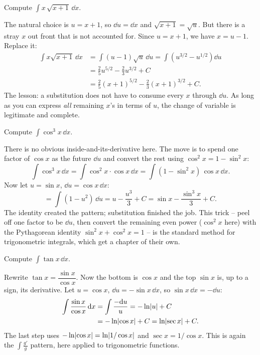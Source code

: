 \begin{example}
\label{ch22:ex-stray}
Compute $\displaystyle \int x\,\sqrt{x+1}\,\dd x$.

The natural choice is $u = x+1$, so $\dd u = \dd x$ and $\sqrt{x+1} = \sqrt u$. But
there is a stray $x$ out front that is not accounted for. Since $u = x+1$, we have
$x = u-1$. Replace it:
\begin{align*}
  \int x\sqrt{x+1}\,\dd x &= \int (u-1)\sqrt u\,\dd u
   = \int \left(u^{3/2} - u^{1/2}\right)\dd u\\
  &= \frac{2}{5}u^{5/2} - \frac{2}{3}u^{3/2} + C\\
  &= \frac{2}{5}(x+1)^{5/2} - \frac{2}{3}(x+1)^{3/2} + C.
\end{align*}
The lesson: a substitution does not have to consume every $x$ through $\dd u$. As
long as you can express \emph{all} remaining $x$'s in terms of $u$, the change of
variable is legitimate and complete.
\end{example}

\begin{example}
\label{ch22:ex-trigid}
Compute $\displaystyle \int \cos^3 x\,\dd x$.

There is no obvious inside-and-its-derivative here. The move is to spend one factor
of $\cos x$ as the future $\dd u$ and convert the rest using
$\cos^2 x = 1 - \sin^2 x$:
\[
  \int \cos^3 x\,\dd x = \int \cos^2 x\cdot \cos x\,\dd x
   = \int (1-\sin^2 x)\,\cos x\,\dd x.
\]
Now let $u = \sin x$, $\dd u = \cos x\,\dd x$:
\[
  = \int (1-u^2)\,\dd u = u - \frac{u^3}{3} + C
  = \sin x - \frac{\sin^3 x}{3} + C.
\]
The identity created the pattern; substitution finished the job. This trick --
peel off one factor to be $\dd u$, then convert the remaining even power
($\cos^2 x$ here) with the Pythagorean identity $\sin^2 x + \cos^2 x = 1$ -- is the
standard method for trigonometric integrals, which get a chapter of
their own.
\end{example}

\begin{example}
\label{ch22:ex-tan}
Compute $\displaystyle \int \tan x\,\dd x$.

Rewrite $\tan x = \dfrac{\sin x}{\cos x}$. Now the bottom is $\cos x$ and the top
$\sin x$ is, up to a sign, its derivative. Let $u = \cos x$, $\dd u = -\sin x\,\dd
x$, so $\sin x\,\dd x = -\dd u$:
\begin{align*}
  \int \frac{\sin x}{\cos x}\,\mathrm{d} x &= \int \frac{-\mathrm{d} u}{u}
   = -\ln\lvert u\rvert + C\\
  &= -\ln\lvert\cos x\rvert + C = \ln\lvert\sec x\rvert + C.
\end{align*}
The last step uses $-\ln\lvert\cos x\rvert = \ln\lvert1/\cos x\rvert$ and $\sec x = 1/\cos x$.
This is again the $\int \frac{g'}{g}$ pattern, here applied to trigonometric functions.
\end{example}

